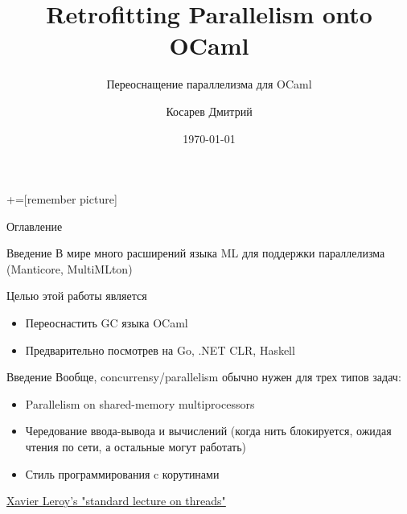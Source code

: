 \documentclass[aspectratio=169
  , xcolor={svgnames} 
  , hyperref={ colorlinks,citecolor=DeepPink4
             , linkcolor=DarkRed,urlcolor=DarkBlue}
  , russian
  ]{beamer}
\title[Retrofitting Parallelism onto OCaml]{Retrofitting Parallelism onto OCaml}
\subtitle{Переоснащение параллелизма для OCaml}
\author{Косарев Дмитрий }
\institute{матмех СПбГУ}
\date{\today}
\theoremstyle{exerciseStyle1}
\begin{document}
\maketitle

+=[remember picture] 

\everymath{\displaystyle}

\begin{frame}{Оглавление}
  \tableofcontents
\end{frame}

\begin{frame}{Введение}
В мире много расширений языка ML для поддержки параллелизма (Manticore, MultiMLton)
\vspace{1cm}

Целью этой работы является 
\begin{itemize}
  \item Переоснастить GC языка OCaml
  \item Предварительно посмотрев на Go, .NET CLR, Haskell
\end{itemize}
\end{frame}

\begin{frame}{Введение}
Вообще, concurrensy/parallelism обычно нужен для трех типов задач:

\begin{itemize}
\item Parallelism on shared-memory multiprocessors
\item Чередование ввода-вывода и вычислений (когда нить блокируется, ожидая чтения по сети, а остальные могут работать)
\item  Стиль программирования c корутинами%
\end{itemize}\vspace{1cm}

\href{https://flyingfrogblog.blogspot.com/2017/04/xavier-leroys-standard-lecture-on.html}{Xavier Leroy's "standard lecture on threads" }
\end{frame}
\end{document}
